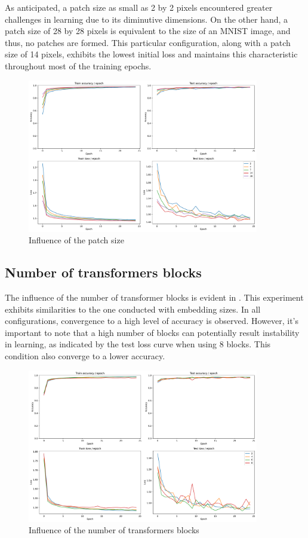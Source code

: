 As anticipated, a patch size as small as 2 by 2 pixels encountered greater challenges in learning due to its diminutive dimensions. On the other hand, a patch size of 28 by 28 pixels is equivalent to the size of an MNIST image, and thus, no patches are formed. This particular configuration, along with a patch size of 14 pixels, exhibits the lowest initial loss and maintains this characteristic throughout most of the training epochs.

\begin{figure}[H]
    \centering
    \includegraphics*[width=0.9\textwidth]{figs/Transformers/patch_size_influence_25.pdf}
    \caption{Influence of the patch size}
    \label{fig:patch_size_influence}
\end{figure}

\subsection{Number of transformers blocks}
The influence of the number of transformer blocks is evident in . This experiment exhibits similarities to the one conducted with embedding sizes. In all configurations, convergence to a high level of accuracy is observed. However, it's important to note that a high number of blocks can potentially result instability in learning, as indicated by the test loss curve when using 8 blocks. This condition also converge to a lower accuracy.

\begin{figure}[H]
    \centering
    \includegraphics*[width=0.9\textwidth]{figs/Transformers/nb_block_influence_25.pdf}
    \caption{Influence of the number of transformers blocks}
    \label{fig:nb_block_influence}
\end{figure}

